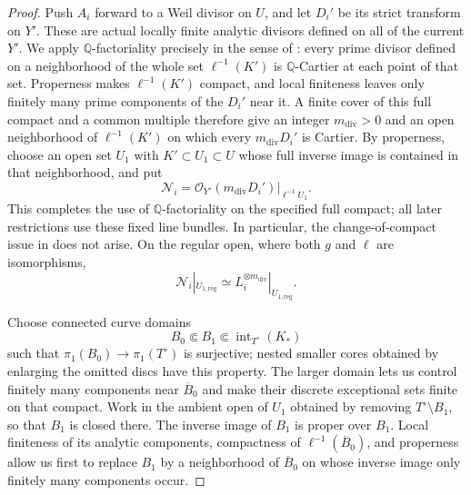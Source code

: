 \documentclass[11pt]{amsart}
\theoremstyle{definition}
\theoremstyle{remark}
\numberwithin{equation}{section}
\newcommand{\Q}{\mathbb{Q}}
\begin{document}
\begin{proof}
Push \(A_i\) forward to a Weil divisor on \(U\), and let \(D_i'\) be
its strict transform on \(Y'\).  These are actual locally finite
analytic divisors defined on all of the current \(Y'\).  We apply
\(\Q\)-factoriality precisely in the sense of
\cite[Definition~2.38]{FujinoAnalyticMMP}: every prime divisor
defined on a neighborhood of the whole set \(\ell^{-1}(K')\)
is \(\Q\)-Cartier at each point of that set.  Properness makes
\(\ell^{-1}(K')\) compact, and local finiteness leaves only finitely
many prime components of the \(D_i'\) near it.  A finite cover of
this full compact and a common multiple therefore give an integer
\(m_{\mathrm{div}}>0\) and an open neighborhood of \(\ell^{-1}(K')\)
on which every \(m_{\mathrm{div}}D_i'\) is Cartier.  By properness,
choose an open set \(U_1\) with \(K'\subset U_1\subset U\) whose full
inverse image is contained in that neighborhood, and put
\[
 \mathcal N_i=\mathcal O_{Y'}(m_{\mathrm{div}}D_i')|_{\ell^{-1}U_1}.
\]
This completes the use of \(\Q\)-factoriality on the specified full
compact; all later restrictions use these fixed line bundles.
In particular, the change-of-compact issue in
\cite[Remark~2.39]{FujinoAnalyticMMP} does not arise.  On the
regular open, where both \(g\) and \(\ell\) are isomorphisms,
\begin{equation}\label{eq:curve-regular-bundles}
 \mathcal N_i|_{U_{1,\mathrm{reg}}}
 \simeq L_i^{\otimes m_{\mathrm{div}}}|_{U_{1,\mathrm{reg}}}.
\end{equation}

Choose connected curve domains
\[
 B_0\Subset B_1\Subset\operatorname{int}_{T^\circ}(K_*)
\]
such that \(\pi_1(B_0)\to\pi_1(T^\circ)\) is surjective; nested
smaller cores obtained by enlarging the omitted discs have this
property.  The larger domain lets us control finitely many components
near \(\overline B_0\) and make their discrete exceptional sets finite
on that compact.  Work in the ambient open of \(U_1\) obtained by removing
\(T^\circ\setminus B_1\), so that \(B_1\) is closed there.
The inverse image of \(B_1\) is proper over \(B_1\).
Local finiteness of its analytic components, compactness of
\(\ell^{-1}(\overline B_0)\), and properness allow us first to
replace \(B_1\) by a neighborhood of \(\overline B_0\) on whose
inverse image only finitely many components occur.


\end{proof}
\end{document}
